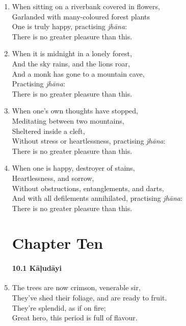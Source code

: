 \documentclass[10pt, openany]{book}
\newcommand*{\vleftofline}[1]{\leavevmode\llap{#1}}
\begin{document}
\begin{enumerate}
\item When sitting on a riverbank covered in flowers,\\
Garlanded with many-coloured forest plants\\
One is truly happy, practising \emph{jhāna}:\\
There is no greater pleasure than this.

\item When it is midnight in a lonely forest,\\
And the sky rains, and the lions roar,\\
And a monk has gone to a mountain cave, \\
Practising \emph{jhāna}:\\
There is no greater pleasure than this.

\item When one’s own thoughts have stopped,\\
Meditating between two mountains, \\
Sheltered inside a cleft,\\
Without stress or heartlessness, practising \emph{jhāna}:\\
There is no greater pleasure than this.

\item When one is happy, destroyer of stains, \\
Heartlessness, and sorrow,\\
Without obstructions, entanglements, and darts,\\
And with all defilements annihilated, practising \emph{jhāna}:\\
There is no greater pleasure than this.

\chapter*{Chapter Ten}

\subsubsection*{10.1 Kāḷudāyi}

\item \vleftofline{“}The trees are now crimson, venerable sir,\\
They’ve shed their foliage, and are ready to fruit.\\
They’re splendid, as if on fire;\\
Great hero, this period is full of flavour.


\end{enumerate}
\end{document}
